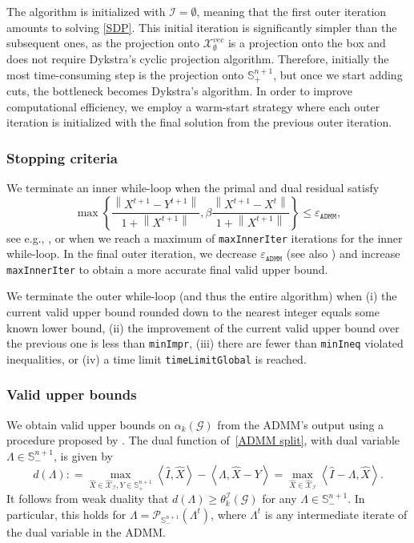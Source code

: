 \documentclass[11pt, a4paper]{article}
\newcommand{\IP}[2]{\left\langle #1, #2 \right\rangle}
\newcommand{\eqdef}{\mathrel{\mathop:}=}
\newcommand\norm[1]{\left\lVert#1\right\rVert}
\newcommand{\mc}{\mathcal}
\newcommand{\aug}[1]{\hat{#1}}
\newcommand{\eps}{\varepsilon}
\begin{document}
The algorithm is initialized with $\mc{I} = \emptyset$, meaning that the first outer iteration amounts to solving \eqref{SDP}. 
This initial iteration is significantly simpler than the subsequent ones, as the projection onto $\mc{X}^{vec}_\emptyset$ is a projection onto the box and does not require Dykstra's cyclic projection algorithm.
Therefore, initially the most time-consuming step is the projection onto $\mathbb{S}^{n+1}_+$, but once we start adding cuts, the bottleneck becomes Dykstra's algorithm. 
In order to improve computational efficiency, we employ a warm-start strategy where each outer iteration is initialized with the final solution from the previous outer iteration.

\subsubsection{Stopping criteria} \label{Sec: Stopping criteria}
We terminate an inner while-loop when the primal and dual residual satisfy
$$\max\left\{\frac{\norm{X^{t+1}-Y^{t+1}}}{1 + \norm{X^{t+1}}}, \beta \frac{\norm{X^{t+1}-X^t}}{1 + \norm{X^{t+1}}}\right\} \leq \eps_\texttt{ADMM},$$
see e.g., \cite{Oliveira2018ADMMForQAP}, 
or when we reach a maximum of \texttt{maxInnerIter} iterations for the inner while-loop.
In the final outer iteration, we decrease $\eps_\texttt{ADMM}$ (see also \cite{deMeijer2023ADMMPartitioning}) and increase \texttt{maxInnerIter} to obtain a more accurate final valid upper bound.

We terminate the outer while-loop (and thus the entire algorithm) when
(i) the current valid upper bound rounded down to the nearest integer equals some known lower bound,
(ii) the improvement of the current valid upper bound over the previous one is less than \texttt{minImpr},
(iii) there are fewer than \texttt{minIneq} violated inequalities,
or (iv) a time limit \texttt{timeLimitGlobal} is reached.

\subsubsection{Valid upper bounds} \label{Sec: Valid upper bounds}
We obtain valid upper bounds on $\alpha_k(\mc{G})$ from the ADMM's output using a procedure proposed by \citet{Oliveira2018ADMMForQAP}.
The dual function of~\eqref{ADMM split}, with dual variable $\Lambda \in \mathbb{S}^{n+1}_-$, is given by
\begin{equation}
    d(\Lambda)
    \eqdef \max_{\aug{X} \in \aug{\mc{X}}_\mc{I}, Y \in \mathbb{S}^{n+1}_+} \IP{\aug{I}}{\aug{X}} - \IP{\Lambda}{\aug{X}-Y}
    = \max_{\aug{X} \in \aug{\mc{X}}_\mc{I}} \IP{\aug{I}-\Lambda}{\aug{X}}. \label{ADMM valid UB} 
\end{equation}
It follows from weak duality that $d(\Lambda) \geq \theta_k^{\mc{I}}(\mc{G})$
for any $\Lambda \in \mathbb{S}^{n+1}_-$.
In particular, this holds for $\Lambda = \mc{P}_{\mathbb{S}^{n+1}_{-}}(\Lambda^t)$, where $\Lambda^t$ is any intermediate iterate of the dual variable in the ADMM.
\end{document}
